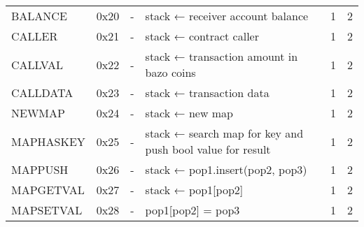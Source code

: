 \begin{longtable}[c]{L{2.5cm} L{1cm} L{3cm} L{5.5cm} R{0.8cm} R{1cm} }
BALANCE   & 0x20   & -                                                                                                        & stack ← receiver account balance                                                                            & 1         & 2          \\
CALLER    & 0x21   & -                                                                                                        & stack ← contract caller                                                                                     & 1         & 2          \\
CALLVAL   & 0x22   & -                                                                                                        & stack ← transaction amount in bazo coins                                                                    & 1         & 2          \\
CALLDATA  & 0x23   & -                                                                                                        & stack ← transaction data                                                                                    & 1         & 2          \\
NEWMAP    & 0x24   & -                                                                                                        & stack ← new map                                                                                             & 1         & 2          \\
MAPHASKEY  & 0x25   & -                                                                                                        & stack ← search map for key and push bool value for result                             & 1         & 2          \\
MAPPUSH   & 0x26   & -                                                                                                        & stack ← pop1.insert(pop2, pop3)                                                                       & 1         & 2          \\
MAPGETVAL & 0x27   & -                                                                                                        & stack ← pop1[pop2]                                                                                    & 1         & 2          \\
MAPSETVAL & 0x28   & -                                                                                                        & pop1[pop2] = pop3                                                                                            & 1         & 2          \\

\end{longtable}
